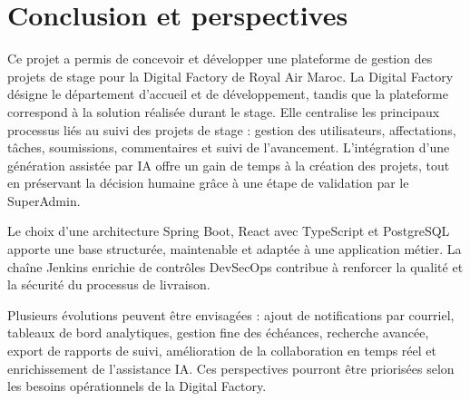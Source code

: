 \chapter{Conclusion et perspectives}
Ce projet a permis de concevoir et développer une plateforme de gestion des projets de stage pour la Digital Factory de Royal Air Maroc. La Digital Factory désigne le département d'accueil et de développement, tandis que la plateforme correspond à la solution réalisée durant le stage. Elle centralise les principaux processus liés au suivi des projets de stage : gestion des utilisateurs, affectations, tâches, soumissions, commentaires et suivi de l'avancement. L'intégration d'une génération assistée par IA offre un gain de temps à la création des projets, tout en préservant la décision humaine grâce à une étape de validation par le SuperAdmin.

Le choix d'une architecture Spring Boot, React avec TypeScript et PostgreSQL apporte une base structurée, maintenable et adaptée à une application métier. La chaîne Jenkins enrichie de contrôles DevSecOps contribue à renforcer la qualité et la sécurité du processus de livraison.

Plusieurs évolutions peuvent être envisagées : ajout de notifications par courriel, tableaux de bord analytiques, gestion fine des échéances, recherche avancée, export de rapports de suivi, amélioration de la collaboration en temps réel et enrichissement de l'assistance IA. Ces perspectives pourront être priorisées selon les besoins opérationnels de la Digital Factory.
